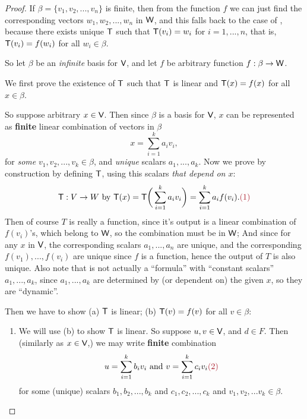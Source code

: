 \begin{proof}
If \(\beta = \{ v_1, v_2, ..., v_n \}\) is finite, then from the function \(f\) we can just find the corresponding vectors \(w_1, w_2, ..., w_n\) in \(\textsf{W}\),
and this falls back to the case of , because there exists unique \LTRAN{} \(\textsf{T}\) such that \(\textsf{T}(v_i) = w_i\) for \(i = 1, ..., n\),
that is, \(\textsf{T}(v_i) = f(w_i)\) for all \(w_i \in \beta\).

So let \(\beta\) be an \emph{infinite} basis for \(\textsf{V}\), and let \(f\) be arbitrary function \(f: \beta \to \textsf{W}\).

We first prove the existence of \(\textsf{T}\) such that \(\textsf{T}\) is linear and \(\textsf{T}(x) = f(x)\) for all \(x \in \beta\).

So suppose arbitrary \(x \in \textsf{V}\).
Then since \(\beta\) is a basis for \(\textsf{V}\), \(x\) can be represented as \textbf{finite} linear combination of vectors in \(\beta\)
\[
    x = \sum_{i = 1}^k a_i v_i,
\]
for \emph{some} \(v_1, v_2, ..., v_k \in \beta\), and \emph{unique} scalars \(a_1, ..., a_k\).
Now we prove by construction by defining \(\textsf{T}\), using this scalars \emph{that depend on \(x\)}:
\[
    \T : V \to W \text{ by } \T(x) = \T\bigg(\sum_{i = 1}^k a_i v_i\bigg) = \sum_{i = 1}^k a_i f(v_i). \MAROON{(1)}
\]
Then of course \(T\) is really a function, since
 it's output is a linear combination of \(f(v_i)\)'s, which belong to \(\textsf{W}\), so the combination must be in \(\textsf{W}\);
 And since for any \(x\) in \(\textsf{V}\), the corresponding scalars \(a_1, ..., a_n\) are unique, and the corresponding \(f(v_1), ..., f(v_i)\) are unique since \(f\) is a function, hence the output of \(T\) is also unique.
Also note that  is not actually a ``formula'' with ``constant scalars'' \(a_1, ..., a_k\), since \(a_1, ..., a_k\) are determined by (or dependent on) the given \(x\), so they are ``dynamic''.

Then we have to show (a) \(\textsf{T}\) is linear; (b) \(\textsf{T}(v) = f(v)\) for all \(v \in \beta\):
\begin{enumerate}
\item
We will use (b) to show \(\textsf{T}\) is linear.
So suppose \(u, v \in \textsf{V}\), and \(d \in F\).
Then (similarly as \(x \in \textsf{V}\),) we may write \textbf{finite} combination
\[
    u = \sum_{i = 1}^{k} b_i v_i \text{ and } v = \sum_{i = 1}^{k} c_i v_i \MAROON{(2)}
\]
for some (unique) scalars \(b_1, b_2, ..., b_k\) and \(c_1, c_2, ..., c_k\) and \(v_1, v_2, ... v_k \in \beta\).


\end{enumerate}
\end{proof}
